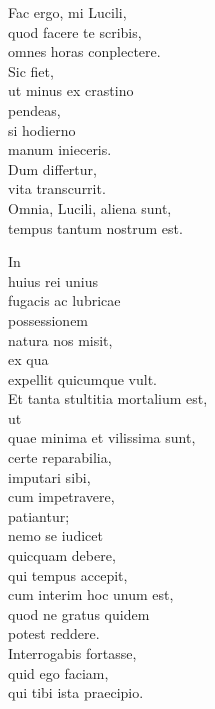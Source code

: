 {\noindent Fac ergo, mi Lucili, \\
\tabto{2em} quod facere te scribis, \\
omnes horas conplectere. \\

\noindent Sic fiet, \\
\tabto{2em} ut minus ex crastino \\
\tabto{3em} pendeas, \\
\tabto{2em} si hodierno \\
\tabto{3em} manum inieceris. \\

\noindent Dum  differtur, \\
vita transcurrit.\\

\noindent Omnia, Lucili, aliena sunt, \\
tempus tantum nostrum est.\\ 

\newpage

\noindent In \\
\tabto{2em} huius rei unius \\
\tabto{3em} fugacis ac lubricae \\
possessionem \\
natura nos misit, \\
\tabto{2em} ex qua \\
\tabto{3em} expellit quicumque vult. \\

\noindent Et tanta stultitia mortalium est, \\
\tabto{2em} ut \\
\tabto{3em} quae minima et vilissima sunt, \\
\tabto{4em} certe reparabilia, \\
\tabto{2em} imputari sibi, \\
\tabto{3em} cum impetravere, \\
\tabto{2em} patiantur; \\
nemo se iudicet \\
\tabto{2em} quicquam debere, \\
qui tempus accepit, \\
\tabto{2em} cum interim hoc unum est, \\
\tabto{3em} quod ne gratus quidem \\
\tabto{4em} potest reddere.\\

\noindent Interrogabis fortasse, \\
\tabto{2em} quid ego faciam, \\
\tabto{3em} qui tibi ista praecipio. \\

}
